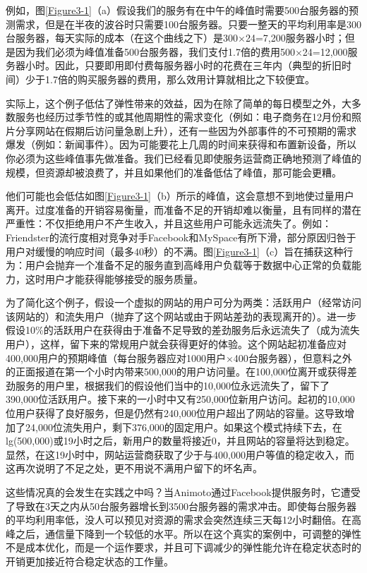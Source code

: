例如，图\ref{Figure3-1}（a）假设我们的服务有在中午的峰值时需要500台服务器的预测需求，但是在半夜的波谷时只需要100台服务器。只要一整天的平均利用率是300台服务器，每天实际的成本（在这个曲线之下）是300$\times$24=7,200服务器小时；但是因为我们必须为峰值准备500台服务器，我们支付1.7倍的费用500$\times$24=12,000服务器小时。因此，只要即用即付费每服务器小时的花费在三年内（典型的折旧时间）少于1.7倍的购买服务器的费用，那么效用计算就相比之下较便宜。

实际上，这个例子低估了弹性带来的效益，因为在除了简单的每日模型之外，大多数服务也经历过季节性的或其他周期性的需求变化（例如：电子商务在12月份和照片分享网站在假期后访问量急剧上升），还有一些因为外部事件的不可预期的需求爆发（例如：新闻事件）。因为可能要花上几周的时间来获得和布置新设备，所以你必须为这些峰值事先做准备。我们已经看见即使服务运营商正确地预测了峰值的规模，但资源却被浪费了，并且如果他们的准备低估了峰值，那可能会更糟。

他们可能也会低估如图\ref{Figure3-1}（b）所示的峰值，这会意想不到地使过量用户离开。过度准备的开销容易衡量，而准备不足的开销却难以衡量，且有同样的潜在严重性：不仅拒绝用户不产生收入，并且这些用户可能永远流失了。例如：Friendster的流行度相对竞争对手Facebook和MySpace有所下滑，部分原因归咎于用户对缓慢的响应时间（最多40秒）的不满。图\ref{Figure3-1}（c）旨在捕获这种行为：用户会抛弃一个准备不足的服务直到高峰用户负载等于数据中心正常的负载能力，这时用户才能获得能够接受的服务质量。

为了简化这个例子，假设一个虚拟的网站的用户可分为两类：活跃用户（经常访问该网站的）和流失用户（抛弃了这个网站或由于网站差劲的表现离开的）。进一步假设10\%的活跃用户在获得由于准备不足导致的差劲服务后永远流失了（成为流失用户），这样，留下来的常规用户就会获得更好的体验。这个网站起初准备应对400,000用户的预期峰值（每台服务器应对1000用户$\times$400台服务器），但意料之外的正面报道在第一个小时内带来500,000的用户访问量。在100,000位离开或获得差劲服务的用户里，根据我们的假设他们当中的10,000位永远流失了，留下了390,000位活跃用户。接下来的一小时中又有250,000位新用户访问。起初的10,000位用户获得了良好服务，但是仍然有240,000位用户超出了网站的容量。这导致增加了24,000位流失用户，剩下376,000的固定用户。如果这个模式持续下去，在lg(500,000)或19小时之后，新用户的数量将接近0，并且网站的容量将达到稳定。显然，在这19小时中，网站运营商获取了少于与400,000用户等值的稳定收入，而这再次说明了不足之处，更不用说不满用户留下的坏名声。

这些情况真的会发生在实践之中吗？当Animoto通过Facebook提供服务时，它遭受了导致在3天之内从50台服务器增长到3500台服务器的需求冲击。即使每台服务器的平均利用率低，没人可以预见对资源的需求会突然连续三天每12小时翻倍。在高峰之后，通信量下降到一个较低的水平。所以在这个真实的案例中，可调整的弹性不是成本优化，而是一个运作要求，并且可下调减少的弹性能允许在稳定状态时的开销更加接近符合稳定状态的工作量。


